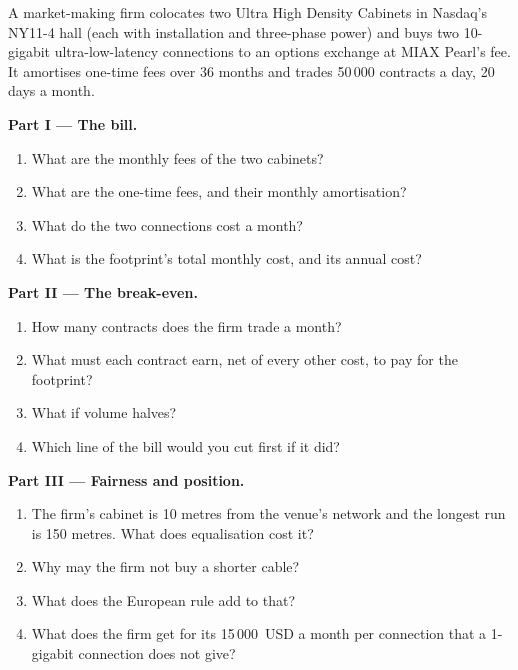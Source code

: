 \begin{problem}\label{pb:nw:colocation-products-and-how-they-are-sold:1}
A market-making firm colocates two Ultra High Density Cabinets in Nasdaq's NY11-4 hall (each with installation and three-phase power) and
buys two 10-gigabit ultra-low-latency connections to an options exchange at MIAX Pearl's fee. It amortises one-time fees over 36 months and
trades 50\,000 contracts a day, 20 days a month.

\medskip\noindent\textbf{Part I --- The bill.}
\begin{enumerate}
\item What are the monthly fees of the two cabinets?
\item What are the one-time fees, and their monthly amortisation?
\item What do the two connections cost a month?
\item What is the footprint's total monthly cost, and its annual cost?
\end{enumerate}

\medskip\noindent\textbf{Part II --- The break-even.}
\begin{enumerate}[resume]
\item How many contracts does the firm trade a month?
\item What must each contract earn, net of every other cost, to pay for the footprint?
\item What if volume halves?
\item Which line of the bill would you cut first if it did?
\end{enumerate}

\medskip\noindent\textbf{Part III --- Fairness and position.}
\begin{enumerate}[resume]
\item The firm's cabinet is 10 metres from the venue's network and the longest run is 150 metres. What does equalisation cost it?
\item Why may the firm not buy a shorter cable?
\item What does the European rule add to that?
\item What does the firm get for its 15\,000~USD a month per connection that a 1-gigabit connection does not give?
\end{enumerate}


\end{problem}
